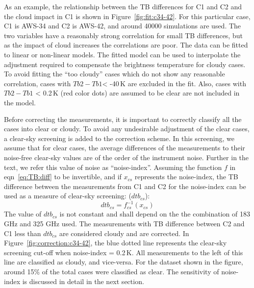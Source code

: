 \documentclass[12pt]{article}
\begin{document}
As an example, the relationship between the TB differences for C1 and C2 and the cloud impact in C1 is shown in  Figure~\ref{fig:fit:c34-42}. For this particular case, C1 is AWS-34 and C2 is AWS-42, and around 40000 simulations are used. The two variables have a reasonably strong correlation for small TB differences, but as the impact of cloud increases the correlations are poor. The data can be fitted to linear or non-linear models. The fitted model can be used to interpolate the adjustment required to compensate the brightness temperature for cloudy cases. To avoid fitting the ``too cloudy'' cases which do not show any reasonable correlation, cases with $Tb2-Tb1$< -40\,K  are excluded in the fit. Also, cases with $Tb2-Tb1$ < 0.2\,K (red color dots) are assumed to be clear are not included in the model.

Before correcting the measurements, it is important to correctly classify all the cases into clear or cloudy. To avoid any undesirable adjustment of the clear cases, a clear-sky screening is added  to the correction scheme. In this screening, we assume that for clear cases, the average differences of the measurements to their noise-free clear-sky values are of the order of the instrument noise. Further in the text, we refer this value of noise as ``noise-index''. Assuming the function $f$ in eqn~\ref{eq:TB:diff} to be invertible, and if $x_{cs}$  represents the noise-index, the TB difference between the measurements from C1 and C2 for the noise-index can be used as a measure of clear-sky screening: ($dtb_{cs}$):
\begin{equation}
dtb_{cs}= f_{cs}^{-1}(x_{cs}) 
\label{eq:dtb}
\end{equation}
The value of $dtb_{cs}$ is not constant and shall depend on the the combination of 183 GHz and 325 GHz used. The measurements with TB difference between C2 and C1 less than $dtb_{cs}$ are considered cloudy and are corrected. In Figure~\ref{fig:correction:c34-42}, the blue dotted line represents the clear-sky screening cut-off when noise-index = 0.2\,K. All measurements to the left of this line are classified as cloudy, and vice-versa. For the dataset shown in the figure, around 15\% of the total cases were classified as clear. The sensitivity of noise-index is discussed in detail in the next section. 
\end{document}
